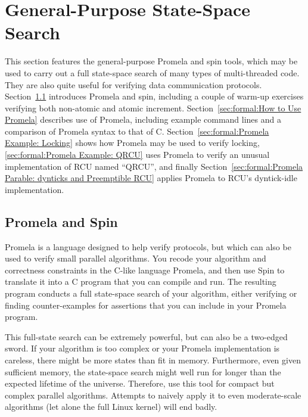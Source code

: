 
\section{General-Purpose State-Space Search}
\label{sec:formal:General-Purpose State-Space Search}

This section features the general-purpose Promela and spin tools,
which may be used to carry out a full
state-space search of many types of multi-threaded code.
They are also quite useful for verifying data communication protocols.
Section~\ref{sec:formal:Promela and Spin}
introduces Promela and spin, including a couple of warm-up exercises
verifying both non-atomic and atomic increment.
Section~\ref{sec:formal:How to Use Promela}
describes use of Promela, including example command lines and a
comparison of Promela syntax to that of C.
Section~\ref{sec:formal:Promela Example: Locking}
shows how Promela may be used to verify locking,
\ref{sec:formal:Promela Example: QRCU}
uses Promela to verify an unusual implementation of RCU named ``QRCU'',
and finally
Section~\ref{sec:formal:Promela Parable: dynticks and Preemptible RCU}
applies Promela to RCU's dyntick-idle implementation.

\subsection{Promela and Spin}
\label{sec:formal:Promela and Spin}

Promela is a language designed to help verify protocols, but which
can also be used to verify small parallel algorithms.
You recode your algorithm and correctness constraints in the C-like
language Promela, and then use Spin to translate it into a C program
that you can compile and run.
The resulting program conducts a full state-space search of your
algorithm, either verifying or finding counter-examples for
assertions that you can include in your Promela program.

This full-state search can be extremely powerful, but can also be a two-edged
sword.
If your algorithm is too complex or your Promela implementation is
careless, there might be more states than fit in memory.
Furthermore, even given sufficient memory, the state-space search might
well run for longer than the expected lifetime of the universe.
Therefore, use this tool for compact but complex parallel algorithms.
Attempts to naively apply it to even moderate-scale algorithms (let alone
the full Linux kernel) will end badly.

